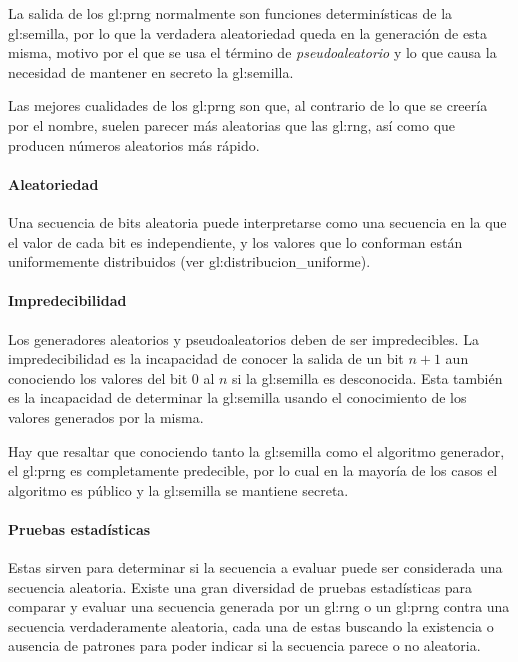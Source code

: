 La salida de los \gls{gl:prng} normalmente son funciones determinísticas de
la \gls{gl:semilla}, por lo que la verdadera aleatoriedad queda en la
generación de esta misma, motivo por el que se usa el término de
\textit{pseudoaleatorio} y lo que causa la necesidad de mantener en secreto
la \gls{gl:semilla}.

Las mejores cualidades de los \gls{gl:prng} son que, al contrario de lo que
se creería por el nombre, suelen parecer más aleatorias que las \gls{gl:rng},
así como que producen números aleatorios más rápido.

\paragraph{Aleatoriedad} %

Una secuencia de bits aleatoria puede interpretarse como una secuencia en la
que el valor de cada bit es independiente, y los valores que lo conforman
están uniformemente distribuidos (ver \gls{gl:distribucion_uniforme}).

\paragraph{Impredecibilidad} %
\label{sec:impredecibilidad}

Los generadores aleatorios y pseudoaleatorios deben de ser impredecibles.
La impredecibilidad es la incapacidad de conocer la salida de un bit $n+1$
aun conociendo los valores del bit $0$ al $n$ si la \gls{gl:semilla} es
desconocida. Esta también es la incapacidad de determinar la \gls{gl:semilla}
usando el conocimiento de los valores generados por la misma.

Hay que resaltar que conociendo tanto la \gls{gl:semilla} como el algoritmo
generador, el \gls{gl:prng} es completamente predecible, por lo cual en la
mayoría de los casos el algoritmo es público y la \gls{gl:semilla} se mantiene
secreta.

\paragraph{Pruebas estadísticas} %

Estas sirven para determinar si la secuencia a evaluar puede ser considerada
una secuencia aleatoria. Existe una gran diversidad de pruebas estadísticas
para comparar y evaluar una secuencia generada por un \gls{gl:rng} o un
\gls{gl:prng} contra una secuencia verdaderamente aleatoria, cada una de
estas buscando la existencia o ausencia de patrones para poder indicar
si la secuencia parece o no aleatoria.


